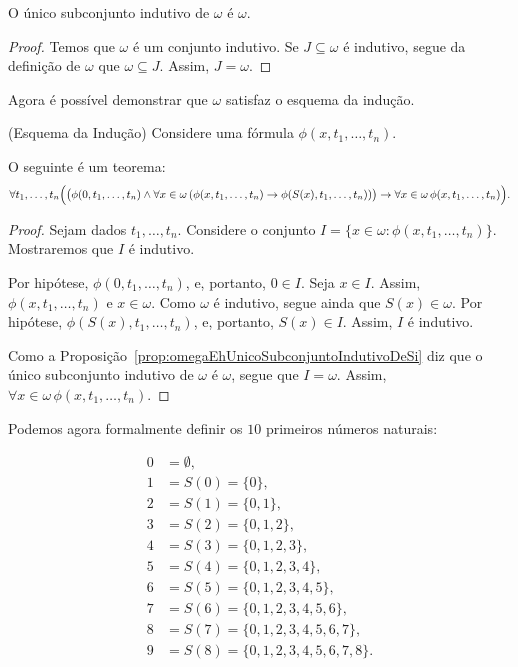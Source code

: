 \begin{proposition}[$\BSTI$]\label{prop:omegaEhUnicoSubconjuntoIndutivoDeSi}
    O único subconjunto indutivo de $\omega$ é $\omega$.
\end{proposition}

\begin{proof}
    Temos que $\omega$ é um conjunto indutivo.
    Se $J\subseteq \omega$ é indutivo, segue da definição de $\omega$ que $\omega \subseteq J$.
    Assim, $J=\omega$.
\end{proof}

Agora é possível demonstrar que $\omega$ satisfaz o esquema da indução.

\begin{proposition}[$\BSTI$](Esquema da Indução)\label{prop:esquemaDaInducaoNosNaturais}
    Considere uma fórmula $\phi(x, t_1, \dots, t_n)$.

    O seguinte é um teorema:
    \[
    \forall t_1, \dots, t_n \Bigl(
        \bigl(
            \phi(0, t_1, \dots, t_n)
            \land
            \forall x \in \omega\, (\phi(x, t_1, \dots, t_n) \rightarrow \phi(S(x), t_1, \dots, t_n))
        \bigr)
        \rightarrow
        \forall x \in \omega\, \phi(x, t_1, \dots, t_n)
    \Bigr).
    \]
\end{proposition}

\begin{proof}
    Sejam dados $t_1, \dots, t_n$.
    Considere o conjunto $I = \{x \in \omega : \phi(x, t_1, \dots, t_n)\}$.
    Mostraremos que $I$ é indutivo.

    Por hipótese, $\phi(0, t_1, \dots, t_n)$, e, portanto, $0\in I$.
    Seja $x\in I$.
    Assim, $\phi(x, t_1, \dots, t_n)$ e $x \in \omega$.
    Como $\omega$ é indutivo, segue ainda que $S(x)\in\omega$.
    Por hipótese, $\phi(S(x), t_1, \dots, t_n)$, e, portanto, $S(x)\in I$.
    Assim, $I$ é indutivo.

    Como a Proposição~\ref{prop:omegaEhUnicoSubconjuntoIndutivoDeSi} diz que o único subconjunto indutivo de $\omega$ é $\omega$, segue que $I=\omega$.
    Assim, $\forall x \in \omega \, \phi(x, t_1, \dots, t_n)$.
\end{proof}

Podemos agora formalmente definir os $10$ primeiros números naturais:
\begin{definition}[$\BST$]\label{def:primeirosNaturais}
    \begin{align*}
        0 &= \emptyset,\\
        1 &= S(0) = \{0\},\\
        2 &= S(1) = \{0,1\},\\
        3 &= S(2) = \{0,1,2\},\\
        4 &= S(3) = \{0,1,2,3\},\\
        5 &= S(4) = \{0,1,2,3,4\},\\
        6 &= S(5) = \{0,1,2,3,4,5\},\\
        7 &= S(6) = \{0,1,2,3,4,5,6\},\\
        8 &= S(7) = \{0,1,2,3,4,5,6,7\},\\
        9 &= S(8) = \{0,1,2,3,4,5,6,7,8\}.
    \end{align*}
\end{definition}

